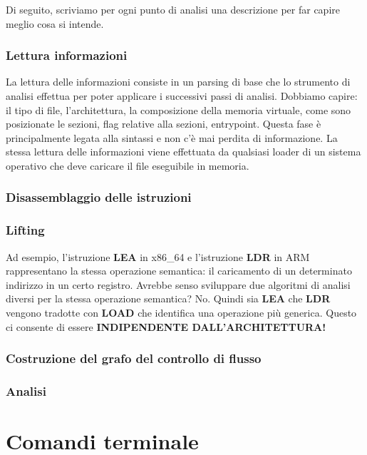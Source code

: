\documentclass[oneside,a4paper,11pt]{book}
\theoremstyle{italicstyle}
\theoremstyle{normStyle}
\begin{document}
Di seguito, scriviamo per ogni punto di analisi una descrizione per far capire meglio cosa si intende.

\subsection{Lettura informazioni}

La lettura delle informazioni consiste in un parsing di base che lo strumento di analisi effettua per poter applicare i successivi passi di analisi. Dobbiamo capire: il tipo di file, l'architettura, la composizione della memoria virtuale, come sono posizionate le sezioni, flag relative alla sezioni, entrypoint. Questa fase è principalmente legata alla sintassi e non c'è mai perdita di informazione. La stessa lettura delle informazioni viene effettuata da qualsiasi loader di un sistema operativo che deve caricare il file eseguibile in memoria.

\subsection{Disassemblaggio delle istruzioni}

\subsection{Lifting}

Ad esempio, l'istruzione \textbf{LEA} in x86\_64 e l'istruzione \textbf{LDR} in ARM rappresentano la stessa operazione semantica: il caricamento di un determinato indirizzo in un certo registro. Avrebbe senso sviluppare due algoritmi di analisi diversi per la stessa operazione semantica? No. Quindi sia \textbf{LEA} che \textbf{LDR} vengono tradotte con \textbf{LOAD} che identifica una operazione più generica. Questo ci consente di essere \textbf{INDIPENDENTE DALL'ARCHITETTURA!} 

\subsection{Costruzione del grafo del controllo di flusso}

\subsection{Analisi}

\chapter{Comandi terminale}
\end{document}
